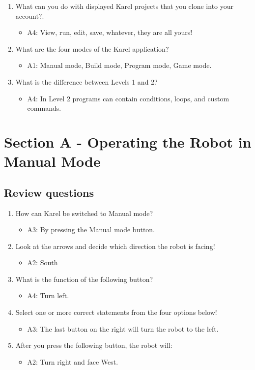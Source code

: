 \documentclass[article,A4,12pt]{llncs}
\begin{document}
\begin{enumerate}
\item What can you do with displayed Karel projects that you clone into your account?.
  \begin{itemize}
    \item A4: View, run, edit, save, whatever, they are all yours!
  \end{itemize}
\item What are the four modes of the Karel application?
  \begin{itemize}
    \item A1: Manual mode, Build mode, Program mode, Game mode.
  \end{itemize}
\item What is the difference between Levels 1 and 2?
  \begin{itemize}
    \item A4: In Level 2 programs can contain conditions, loops, and custom commands.
  \end{itemize}
\end{enumerate}

\section{Section A - Operating the Robot in Manual Mode}

\subsection{Review questions}

\begin{enumerate}
\item How can Karel be switched to Manual mode?
  \begin{itemize}
    \item A3: By pressing the Manual mode button.
  \end{itemize}
\item Look at  the arrows and decide which direction the robot is facing!
  \begin{itemize}
    \item A2: South
  \end{itemize}
\item What is the function of the following button?
  \begin{itemize}
    \item A4: Turn left.
  \end{itemize}
\item Select one or more correct statements from the four options below!
  \begin{itemize}
    \item A3: The last button on the right will turn the robot to the left.
  \end{itemize}
\item After you press the following button, the robot will:
  \begin{itemize}
    \item A2: Turn right and face West.
  \end{itemize}
\end{enumerate}
\end{document}
